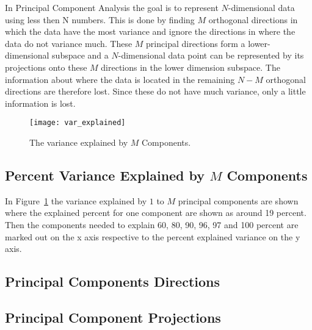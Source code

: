 
In Principal Component Analysis the goal is to represent $N$-dimensional data using less then N numbers. This is done by finding $M$ orthogonal directions in which the data have the most variance and ignore the directions in where the data do not variance much. These $M$ principal directions form a lower-dimensional subspace and a $N$-dimensional data point can be represented by its projections onto these $M$ directions in the lower dimension subspace. The information about where the data is located in the remaining $N-M$ orthogonal directions are therefore lost. Since these do not have much variance, only a little information is lost.

\begin{figure}[hbtp]
\centering
\texttt{[image: var\_explained]}
\caption{The variance explained by $M$ Components.\label{fig:pca_var_explained}}
\end{figure}

\subsection{Percent Variance Explained by $M$ Components}

In Figure~\ref{fig:pca_var_explained} the variance explained by $1$ to $M$ principal components are shown where the explained percent for one component are shown as around 19 percent. Then the components needed to explain 60, 80, 90, 96, 97 and 100 percent are marked out on the x axis respective to the percent explained variance on the y axis.

\subsection{Principal Components Directions}

\subsection{Principal Component Projections}
